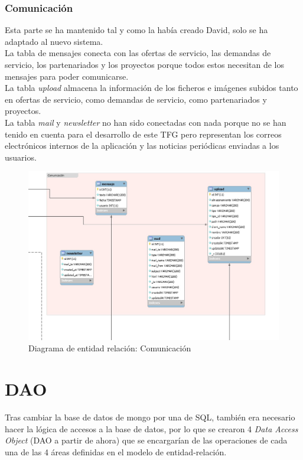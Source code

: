 \documentclass[11pt]{article}
\begin{document}
\subsubsection{Comunicación}
Esta parte se ha mantenido tal y como la había creado David, solo se ha adaptado al nuevo sistema.\\
La tabla de mensajes conecta con las ofertas de servicio, las demandas de servicio, los partenariados y los proyectos porque todos estos necesitan de los mensajes para poder comunicarse.\\
La tabla \textit{upload} almacena la información de los ficheros e imágenes subidos tanto en ofertas de servicio, como demandas de servicio, como partenariados y proyectos.\\
La tabla \textit{mail} y \textit{newsletter} no han sido conectadas con nada porque no se han tenido en cuenta para el desarrollo de este TFG pero representan los correos electrónicos internos de la aplicación y las noticias periódicas enviadas a los usuarios.
\begin{figure}
	\centering
	\includegraphics[scale=0.4]{comunicacion}
	\caption{Diagrama de entidad relación: Comunicación}
\end{figure}

\section{DAO}

Tras cambiar la base de datos de mongo por una de SQL, también era necesario hacer la lógica de accesos a la base de datos, por lo que se crearon 4 \emph{Data Access Object} (DAO a partir de ahora) que se encargarían de las operaciones de cada una de las 4 áreas definidas en el modelo de entidad-relación.
\end{document}
